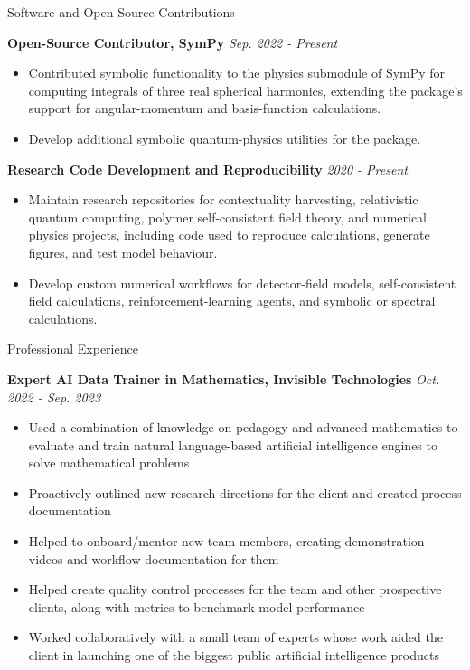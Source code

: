 \documentclass{resume} %
\begin{document}
\begin{rSection}{Software and Open-Source Contributions}

{\bf Open-Source Contributor, SymPy}
\hfill\textit{{Sep. 2022 - Present}}
\begin{itemize}
\item Contributed symbolic functionality to the physics submodule of SymPy for computing integrals of three real spherical harmonics, extending the package's support for angular-momentum and basis-function calculations.
\item Develop additional symbolic quantum-physics utilities for the package.
\end{itemize}

{\bf Research Code Development and Reproducibility}
\hfill\textit{{2020 - Present}}
\begin{itemize}
\item Maintain research repositories for contextuality harvesting, relativistic quantum computing, polymer self-consistent field theory, and numerical physics projects, including code used to reproduce calculations, generate figures, and test model behaviour.
\item Develop custom numerical workflows for detector-field models, self-consistent field calculations, reinforcement-learning agents, and symbolic or spectral calculations.
\end{itemize}

\end{rSection}

\vspace{1em}

\begin{rSection}{Professional Experience}

{\bf{Expert AI Data Trainer in Mathematics, Invisible Technologies}}
\hfill\textit{{Oct. 2022 - Sep. 2023}}
\begin{itemize}
\item Used a combination of knowledge on pedagogy and advanced mathematics to evaluate and train natural language-based artificial intelligence engines to solve mathematical problems
\item Proactively outlined new research directions for the client and created process documentation
\item Helped to onboard/mentor new team members, creating demonstration videos and workflow documentation for them
\item Helped create quality control processes for the team and other prospective clients, along with metrics to benchmark model performance
\item Worked collaboratively with a small team of experts whose work aided the client in launching one of the biggest public artificial intelligence products
\end{itemize}

\end{rSection}
\end{document}
